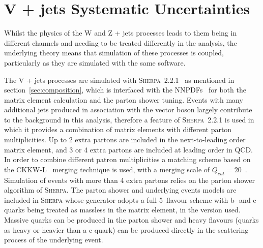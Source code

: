 \section{V + jets Systematic Uncertainties}
\label{sec:vjets}
Whilst the physics of the W and Z + jets processes leads to them being in
different channels and needing to be treated differently in the analysis, the
underlying theory means that simulation of these processes is coupled,
particularly as they are simulated with the same software.

The V + jets processes are simulated with
\textsc{Sherpa}~2.2.1~\cite{1126-6708-2009-02-007} as mentioned in
section~\ref{sec:composition}, which is interfaced with the
NNPDFs~\cite{Ball:2012cx} for both the matrix element calculation and the parton shower
tuning. Events with many additional jets produced in association with the vector
boson largely contribute to the background in this analysis, therefore a feature
of \textsc{Sherpa}~2.2.1 is used in which it provides a combination of matrix
elements with different parton multiplicities. Up to 2 extra partons are
included in the next-to-leading order matrix element, and 3 or 4 extra partons
are included at leading order in QCD. In order to combine different patron
multiplicities a matching scheme based on the CKKW-L~\cite{Lonnblad:2001iq,
  Lavesson:2005xu} merging technique is used, with a merging scale of $Q_{cut} =
20$~\GeV. Simulation of events with more than 4 extra partons relies on the
parton shower algorithm of \textsc{Sherpa}. The parton shower and underlying
events models are included in \textsc{Sherpa} whose generator adopts a full
5--flavour scheme with b- and c-quarks being treated as massless in the matrix
element, in the version used. Massive quarks can be produced in the parton
shower and heavy flavours (quarks as heavy or heavier than a c-quark) can be
produced directly in the scattering process of the underlying event.

